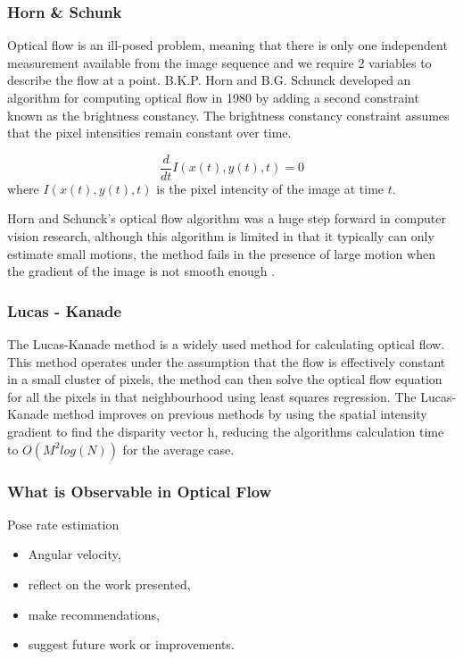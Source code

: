 \documentclass{UoNMCHA}
\numberwithin{equation}{section}
\begin{document}
\subsubsection{Horn \& Schunk} %
Optical flow is an ill-posed problem, meaning that there is only one independent measurement available from the image sequence and we require 2 variables to describe the flow at a point. B.K.P. Horn and B.G. Schunck developed an algorithm for computing optical flow in 1980 \citep{horn1981determining} by adding a second constraint known as the brightness constancy. The brightness constancy constraint assumes that the pixel intensities remain constant over time.

\begin{equation}
	\frac{d}{dt} I(x(t), y(t), t) = 0
\end{equation}
where $I(x(t), y(t), t)$ is the pixel intencity of the image at time $t$.

Horn and Schunck's optical flow algorithm was a huge step forward in computer vision research, although this algorithm is limited in that it typically can only estimate small motions, the method fails in the presence of large motion when the gradient of the image is not smooth enough \citep{meinhardt2013horn}.
\subsubsection{Lucas - Kanade} %
The Lucas-Kanade method is a widely used method for calculating optical flow. This method operates under the assumption that the flow is effectively constant in a small cluster of pixels, the method can then solve the optical flow equation for all the pixels in that neighbourhood using least squares regression. The Lucas-Kanade method improves on previous methods by using the spatial intensity gradient to find the disparity vector h, reducing the algorithms calculation time to $O(M^2log(N))$ for the average case.

\subsubsection{What is Observable in Optical Flow}
Pose rate estimation

\begin{itemize}
	\item Angular velocity,
	\item reflect on the work presented, 
	\item make recommendations,
	\item suggest future work or improvements.
\end{itemize}
\end{document}
